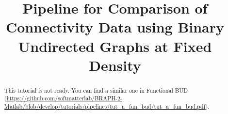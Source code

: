 \documentclass[justified]{tufte-handout}
\title{Pipeline for Comparison of Connectivity Data using Binary Undirected Graphs at Fixed Density}
\begin{document}
\maketitle

\begin{abstract}
\noindent
This tutorial is not ready. You can find a similar one in Functional BUD (\url{https://github.com/softmatterlab/BRAPH-2-Matlab/blob/develop/tutorials/pipelines/tut_a_fun_bud/tut_a_fun_bud.pdf}).
\end{abstract}
\end{document}
